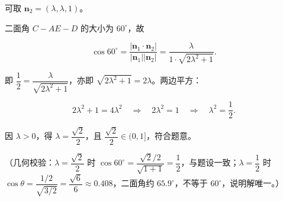 \begin{answer}
可取 $\boldsymbol n_2=(\lambda,\lambda,1)$。

二面角 $C-AE-D$ 的大小为 $60^\circ$，故

\nopagebreak[4]
\[\cos60^\circ=\frac{|\boldsymbol n_1\cdot\boldsymbol n_2|}{|\boldsymbol n_1||\boldsymbol n_2|}
=\frac{\lambda}{1\cdot\sqrt{2\lambda^2+1}}.\]

即 $\dfrac12=\dfrac{\lambda}{\sqrt{2\lambda^2+1}}$，亦即 $\sqrt{2\lambda^2+1}=2\lambda$。两边平方：

\nopagebreak[4]
\[2\lambda^2+1=4\lambda^2\quad\Longrightarrow\quad2\lambda^2=1\quad\Longrightarrow\quad\lambda^2=\frac12.\]

因 $\lambda>0$，得 $\lambda=\dfrac{\sqrt2}{2}$，且 $\dfrac{\sqrt2}{2}\in(0,1]$，符合题意。

（几何校验：$\lambda=\dfrac{\sqrt2}{2}$ 时 $\cos60^\circ=\dfrac{\sqrt2/2}{\sqrt{1+1}}=\dfrac12$，与题设一致；$\lambda=\dfrac12$ 时 $\cos\theta=\dfrac{1/2}{\sqrt{3/2}}=\dfrac{\sqrt6}{6}\approx0.408$，二面角约 $65.9^\circ$，不等于 $60^\circ$，说明解唯一。）


\end{answer}
